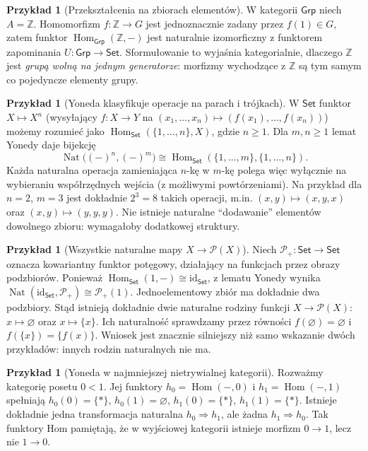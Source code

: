 \documentclass[11pt,a4paper]{article}
\numberwithin{equation}{section}
\theoremstyle{plain}
\theoremstyle{definition}
\newtheorem{przyklad}[twierdzenie]{Przykład}
\theoremstyle{remark}
\newcommand{\cat}[1]{\mathsf{#1}}
\newcommand{\Set}{\cat{Set}}
\newcommand{\Grp}{\cat{Grp}}
\newcommand{\id}{\mathrm{id}}
\newcommand{\Hom}{\operatorname{Hom}}
\newcommand{\Nat}{\operatorname{Nat}}
\begin{document}
\begin{przyklad}[Przekształcenia na zbiorach elementów]
W kategorii $\Grp$ niech $A=\mathbb Z$. Homomorfizm $f:\mathbb Z\to G$ jest jednoznacznie zadany przez $f(1)\in G$, zatem funktor $\Hom_{\Grp}(\mathbb Z,-)$ jest naturalnie izomorficzny z funktorem zapominania $U:\Grp\to\Set$. Sformułowanie to wyjaśnia kategorialnie, dlaczego $\mathbb Z$ jest \emph{grupą wolną na jednym generatorze}: morfizmy wychodzące z $\mathbb Z$ są tym samym co pojedyncze elementy grupy.
\end{przyklad}


\begin{przyklad}[Yoneda klasyfikuje operacje na parach i trójkach]\label{przyklad:yoneda-tuple}
W $\Set$ funktor $X\mapsto X^n$ (wysyłający $f:X\to Y$ na $(x_1,\ldots,x_n)\mapsto(f(x_1),\ldots,f(x_n))$) możemy rozumieć jako $\Hom_{\Set}(\{1,\ldots,n\},X)$, gdzie $n\geq1$. Dla $m,n\geq1$ lemat Yonedy daje bijekcję
\[
\Nat\bigl((- )^n,(- )^m\bigr)\cong\Hom_{\Set}(\{1,\ldots,m\},\{1,\ldots,n\}).
\]
Każda naturalna operacja zamieniająca $n$-kę w $m$-kę polega więc wyłącznie na wybieraniu współrzędnych wejścia (z możliwymi powtórzeniami). Na przykład dla $n=2$, $m=3$ jest dokładnie $2^3=8$ takich operacji, m.in. $(x,y)\mapsto(x,y,x)$ oraz $(x,y)\mapsto(y,y,y)$. Nie istnieje naturalne ``dodawanie'' elementów dowolnego zbioru: wymagałoby dodatkowej struktury.
\end{przyklad}

\begin{przyklad}[Wszystkie naturalne mapy $X\to\mathcal P(X)$]
Niech $\mathcal P_+:\Set\to\Set$ oznacza kowariantny funktor potęgowy, działający na funkcjach przez obrazy podzbiorów. Ponieważ $\Hom_{\Set}(1,-)\cong\id_{\Set}$, z lematu Yonedy wynika
$\Nat(\id_{\Set},\mathcal P_+)\cong\mathcal P_+(1)$. Jednoelementowy zbiór ma dokładnie dwa podzbiory. Stąd istnieją dokładnie dwie naturalne rodziny funkcji $X\to\mathcal P(X)$: $x\mapsto\varnothing$ oraz $x\mapsto\{x\}$. Ich naturalność sprawdzamy przez równości $f(\varnothing)=\varnothing$ i $f(\{x\})=\{f(x)\}$. Wniosek jest znacznie silniejszy niż samo wskazanie dwóch przykładów: innych rodzin naturalnych nie ma.
\end{przyklad}

\begin{przyklad}[Yoneda w najmniejszej nietrywialnej kategorii]
Rozważmy kategorię posetu $0<1$. Jej funktory $h_0=\Hom(-,0)$ i $h_1=\Hom(-,1)$ spełniają
$h_0(0)=\{*\}$, $h_0(1)=\varnothing$, $h_1(0)=\{*\}$, $h_1(1)=\{*\}$. Istnieje dokładnie jedna transformacja naturalna $h_0\Rightarrow h_1$, ale żadna $h_1\Rightarrow h_0$. Tak funktory Hom pamiętają, że w wyjściowej kategorii istnieje morfizm $0\to1$, lecz nie $1\to0$.
\end{przyklad}
\end{document}
